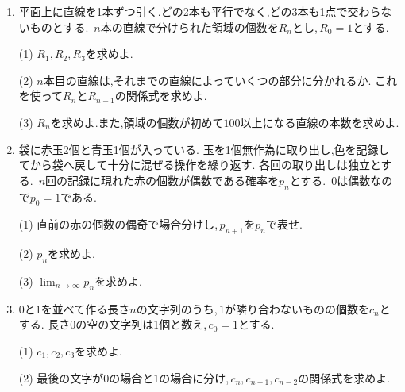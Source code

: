        \begin{enumerate}[label=\textbf{問\arabic*.},leftmargin=3.8em,format=\bookitemlink{practice-bridge}{problem}{answer}]
          \item 平面上に直線を1本ずつ引く.どの2本も平行でなく,どの3本も1点で交わらないものとする.\,
                $\displaystyle n$本の直線で分けられた領域の個数を$\displaystyle R_n$とし,\,$\displaystyle R_0=1$とする.
                \par\smallskip\noindent
                (1) $\displaystyle R_1,R_2,R_3$を求めよ.
                \par\smallskip\noindent
                (2) $\displaystyle n$本目の直線は,それまでの直線によっていくつの部分に分かれるか.
                これを使って$\displaystyle R_n$と$\displaystyle R_{n-1}$の関係式を求めよ.
                \par\smallskip\noindent
                (3) $\displaystyle R_n$を求めよ.また,領域の個数が初めて$\displaystyle 100$以上になる直線の本数を求めよ.
          \item 袋に赤玉2個と青玉1個が入っている.
                玉を1個無作為に取り出し,色を記録してから袋へ戻して十分に混ぜる操作を繰り返す.
                各回の取り出しは独立とする.\,
                $\displaystyle n$回の記録に現れた赤の個数が偶数である確率を$\displaystyle p_n$とする.\,
                $\displaystyle 0$は偶数なので$\displaystyle p_0=1$である.
                \par\smallskip\noindent
                (1) 直前の赤の個数の偶奇で場合分けし,\,$\displaystyle p_{n+1}$を$\displaystyle p_n$で表せ.
                \par\smallskip\noindent
                (2) $\displaystyle p_n$を求めよ.
                \par\smallskip\noindent
                (3) $\displaystyle \lim_{n\to\infty}p_n$を求めよ.
          \item $\displaystyle 0$と$\displaystyle 1$を並べて作る長さ$\displaystyle n$の文字列のうち,\,$\displaystyle 1$が隣り合わないものの個数を$\displaystyle c_n$とする.
                長さ$\displaystyle 0$の空の文字列は1個と数え,\,$\displaystyle c_0=1$とする.
                \par\smallskip\noindent
                (1) $\displaystyle c_1,c_2,c_3$を求めよ.
                \par\smallskip\noindent
                (2) 最後の文字が$\displaystyle 0$の場合と$\displaystyle 1$の場合に分け,\,$\displaystyle c_n,c_{n-1},c_{n-2}$の関係式を求めよ.

\end{enumerate}

